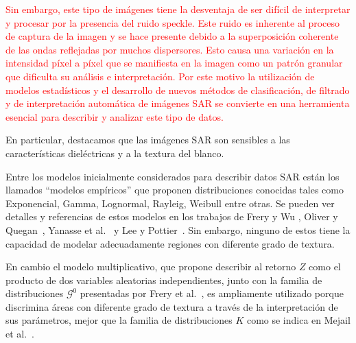 \documentclass[11pt]{article}
\begin{document}
\textcolor{red}{
Sin embargo, este tipo de imágenes tiene la desventaja de ser difícil de interpretar y procesar por la presencia del ruido speckle. 
Este ruido es inherente al proceso de captura de la imagen y se hace presente debido a la superposición coherente de las ondas reflejadas por muchos dispersores. Esto causa una variación en la intensidad píxel a píxel que se manifiesta en la imagen como un patrón granular que dificulta su análisis e interpretación. 
Por este motivo la utilización de modelos estadísticos y el desarrollo de nuevos métodos de clasificación, de filtrado y de interpretación automática de imágenes SAR se convierte en una herramienta esencial para describir y analizar este tipo de datos.}

En particular, destacamos que las imágenes SAR son sensibles a las características dieléctricas y a la textura del blanco.

Entre los modelos inicialmente considerados para describir datos SAR están los llamados ``modelos empíricos'' que proponen distribuciones conocidas tales como Exponencial, Gamma, Lognormal, Rayleig, Weibull entre otras. Se pueden ver detalles y referencias de estos modelos en los trabajos de Frery y Wu \cite{FreryLibro2019}, Oliver y Quegan~\cite{oliverquegan98}, Yanasse et al.~\cite{Yanasse93} y Lee y Pottier~\cite{Lee2009}. 
Sin embargo, ninguno de estos tiene la capacidad de modelar adecuadamente regiones con diferente grado de textura.
%

En cambio el modelo multiplicativo, que propone describir al retorno $Z$ como el producto de dos variables aleatorias independientes, junto con la familia de distribuciones $\mathcal{G}^0$ presentadas por Frery et al.~\cite{Frery97}, es ampliamente utilizado porque discrimina áreas con diferente grado de textura a través de la interpretación de sus parámetros, mejor que la familia de distribuciones $K$ como se indica en Mejail et al.~\cite{MejailJacoboFreryBustos:IJRS}.

\end{document}

